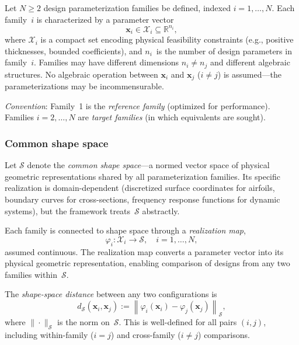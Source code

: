 Let $N \geq 2$ design parameterization families be defined, indexed $i = 1, \ldots, N$. Each family~$i$ is characterized by a parameter vector
\begin{equation}
    \mathbf{x}_i \in \mathcal{X}_i \subseteq \mathbb{R}^{n_i},
    \label{eq:param_vector}
\end{equation}
where $\mathcal{X}_i$ is a compact set encoding physical feasibility constraints (e.g., positive thicknesses, bounded coefficients), and $n_i$~is the number of design parameters in family~$i$. Families may have different dimensions $n_i \neq n_j$ and different algebraic structures. No algebraic operation between $\mathbf{x}_i$ and $\mathbf{x}_j$ ($i \neq j$) is assumed---the parameterizations may be incommensurable.

\emph{Convention}: Family~1 is the \emph{reference family} (optimized for performance). Families $i = 2, \ldots, N$ are \emph{target families} (in which equivalents are sought).


\subsubsection{Common shape space}
\label{sec:shape_space}

Let $\mathcal{S}$ denote the \emph{common shape space}---a normed vector space of physical geometric representations shared by all parameterization families. Its specific realization is domain-dependent (discretized surface coordinates for airfoils, boundary curves for cross-sections, frequency response functions for dynamic systems), but the framework treats~$\mathcal{S}$ abstractly.

Each family is connected to shape space through a \emph{realization map},
\begin{equation}
    \varphi_i : \mathcal{X}_i \to \mathcal{S}, \quad i = 1, \ldots, N,
    \label{eq:realization_map}
\end{equation}
assumed continuous. The realization map converts a parameter vector into its physical geometric representation, enabling comparison of designs from any two families within~$\mathcal{S}$.

The \emph{shape-space distance} between any two configurations is
\begin{equation}
    d_{\mathcal{S}}(\mathbf{x}_i, \mathbf{x}_j)
    := \left\| \varphi_i(\mathbf{x}_i) - \varphi_j(\mathbf{x}_j) \right\|_{\mathcal{S}},
    \label{eq:shape_distance}
\end{equation}
where $\|\cdot\|_{\mathcal{S}}$ is the norm on~$\mathcal{S}$. This is well-defined for all pairs $(i,j)$, including within-family ($i = j$) and cross-family ($i \neq j$) comparisons.

